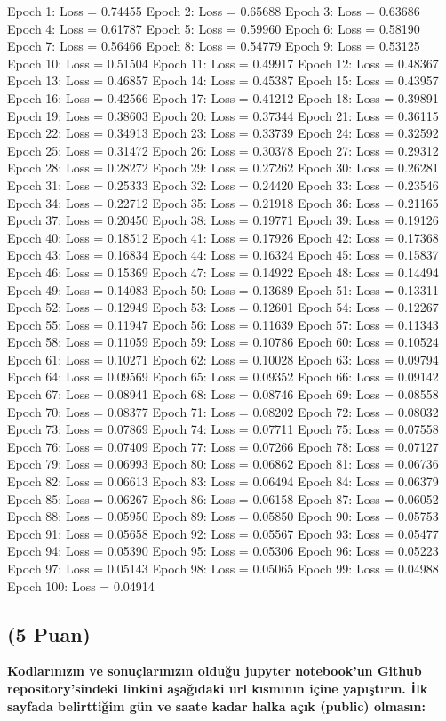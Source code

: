 \documentclass[11pt]{article}
\begin{document}
Epoch 1: Loss = 0.74455
Epoch 2: Loss = 0.65688
Epoch 3: Loss = 0.63686
Epoch 4: Loss = 0.61787
Epoch 5: Loss = 0.59960
Epoch 6: Loss = 0.58190
Epoch 7: Loss = 0.56466
Epoch 8: Loss = 0.54779
Epoch 9: Loss = 0.53125
Epoch 10: Loss = 0.51504
Epoch 11: Loss = 0.49917
Epoch 12: Loss = 0.48367
Epoch 13: Loss = 0.46857
Epoch 14: Loss = 0.45387
Epoch 15: Loss = 0.43957
Epoch 16: Loss = 0.42566
Epoch 17: Loss = 0.41212
Epoch 18: Loss = 0.39891
Epoch 19: Loss = 0.38603
Epoch 20: Loss = 0.37344
Epoch 21: Loss = 0.36115
Epoch 22: Loss = 0.34913
Epoch 23: Loss = 0.33739
Epoch 24: Loss = 0.32592
Epoch 25: Loss = 0.31472
Epoch 26: Loss = 0.30378
Epoch 27: Loss = 0.29312
Epoch 28: Loss = 0.28272
Epoch 29: Loss = 0.27262
Epoch 30: Loss = 0.26281
Epoch 31: Loss = 0.25333
Epoch 32: Loss = 0.24420
Epoch 33: Loss = 0.23546
Epoch 34: Loss = 0.22712
Epoch 35: Loss = 0.21918
Epoch 36: Loss = 0.21165
Epoch 37: Loss = 0.20450
Epoch 38: Loss = 0.19771
Epoch 39: Loss = 0.19126
Epoch 40: Loss = 0.18512
Epoch 41: Loss = 0.17926
Epoch 42: Loss = 0.17368
Epoch 43: Loss = 0.16834
Epoch 44: Loss = 0.16324
Epoch 45: Loss = 0.15837
Epoch 46: Loss = 0.15369
Epoch 47: Loss = 0.14922
Epoch 48: Loss = 0.14494
Epoch 49: Loss = 0.14083
Epoch 50: Loss = 0.13689
Epoch 51: Loss = 0.13311
Epoch 52: Loss = 0.12949
Epoch 53: Loss = 0.12601
Epoch 54: Loss = 0.12267
Epoch 55: Loss = 0.11947
Epoch 56: Loss = 0.11639
Epoch 57: Loss = 0.11343
Epoch 58: Loss = 0.11059
Epoch 59: Loss = 0.10786
Epoch 60: Loss = 0.10524
Epoch 61: Loss = 0.10271
Epoch 62: Loss = 0.10028
Epoch 63: Loss = 0.09794
Epoch 64: Loss = 0.09569
Epoch 65: Loss = 0.09352
Epoch 66: Loss = 0.09142
Epoch 67: Loss = 0.08941
Epoch 68: Loss = 0.08746
Epoch 69: Loss = 0.08558
Epoch 70: Loss = 0.08377
Epoch 71: Loss = 0.08202
Epoch 72: Loss = 0.08032
Epoch 73: Loss = 0.07869
Epoch 74: Loss = 0.07711
Epoch 75: Loss = 0.07558
Epoch 76: Loss = 0.07409
Epoch 77: Loss = 0.07266
Epoch 78: Loss = 0.07127
Epoch 79: Loss = 0.06993
Epoch 80: Loss = 0.06862
Epoch 81: Loss = 0.06736
Epoch 82: Loss = 0.06613
Epoch 83: Loss = 0.06494
Epoch 84: Loss = 0.06379
Epoch 85: Loss = 0.06267
Epoch 86: Loss = 0.06158
Epoch 87: Loss = 0.06052
Epoch 88: Loss = 0.05950
Epoch 89: Loss = 0.05850
Epoch 90: Loss = 0.05753
Epoch 91: Loss = 0.05658
Epoch 92: Loss = 0.05567
Epoch 93: Loss = 0.05477
Epoch 94: Loss = 0.05390
Epoch 95: Loss = 0.05306
Epoch 96: Loss = 0.05223
Epoch 97: Loss = 0.05143
Epoch 98: Loss = 0.05065
Epoch 99: Loss = 0.04988
Epoch 100: Loss = 0.04914

\subsection{(5 Puan)} \textbf{Kodlarınızın ve sonuçlarınızın olduğu jupyter notebook'un Github repository'sindeki linkini aşağıdaki url kısmının içine yapıştırın. İlk sayfada belirttiğim gün ve saate kadar halka açık (public) olmasın:}
\end{document}
